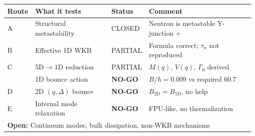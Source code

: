 \begin{center}
\begin{tabular}{lllp{5.5cm}}
\toprule
\textbf{Route} & \textbf{What it tests} & \textbf{Status} & \textbf{Comment} \\
\midrule
A & Structural metastability & CLOSED & Neutron is metastable Y-junction \tagDc{}+\tagP{} \\
B & Effective 1D WKB & PARTIAL & Formula correct; $\tau_n$ not reproduced \\
C & 5D$\to$1D reduction & PARTIAL & $M(q)$, $V(q)$, $\Gamma_0$ derived \tagDc{} \\
  & 1D bounce action & \textbf{NO-GO} & $B/\hbar = 0.009$ vs required $60.7$ \\
D & 2D $(q,\Delta)$ bounce & \textbf{NO-GO} & $B_{2\mathrm{D}} = B_{1\mathrm{D}}$, no help \\
E & Internal mode relaxation & \textbf{NO-GO} & FPU-like, no thermalization \\
\midrule
\multicolumn{4}{l}{\textbf{Open:} Continuum modes, bulk dissipation, non-WKB mechanisms} \\
\bottomrule
\end{tabular}
\end{center}

